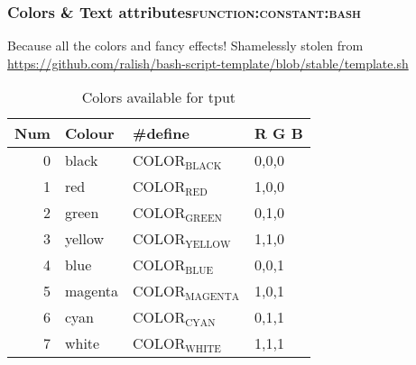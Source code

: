 \documentclass[11pt]{article}
\begin{document}
\subsubsection{Colors \& Text attributes\hfill{}\textsc{function:constant:bash}}
\label{sec:org0982ee0}

Because all the colors and fancy effects! Shamelessly stolen from \url{https://github.com/ralish/bash-script-template/blob/stable/template.sh} 

\begin{table}[htbp]
\caption{Colors available for tput}
\centering
\begin{tabular}{rlll}
\hline
Num & Colour & \#define & R G B\\
\hline
0 & black & COLOR\(_{\text{BLACK}}\) & 0,0,0\\
1 & red & COLOR\(_{\text{RED}}\) & 1,0,0\\
2 & green & COLOR\(_{\text{GREEN}}\) & 0,1,0\\
3 & yellow & COLOR\(_{\text{YELLOW}}\) & 1,1,0\\
4 & blue & COLOR\(_{\text{BLUE}}\) & 0,0,1\\
5 & magenta & COLOR\(_{\text{MAGENTA}}\) & 1,0,1\\
6 & cyan & COLOR\(_{\text{CYAN}}\) & 0,1,1\\
7 & white & COLOR\(_{\text{WHITE}}\) & 1,1,1\\
\hline
\end{tabular}
\end{table}
\end{document}
